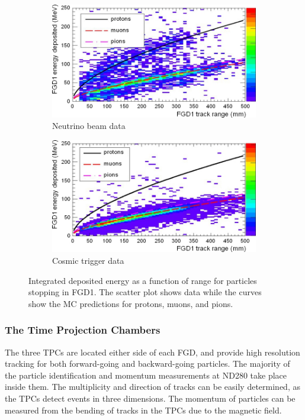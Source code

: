 \begin{figure}
\centering
\hspace{0.7cm}
\begin{subfigure}{.7\textwidth}
\centering
  \includegraphics[width=0.95\linewidth]{figs/FGD1beam}
  \caption{Neutrino beam data}
  \label{fig:fgd1beam}
\end{subfigure}
\newline
\begin{subfigure}{.7\textwidth}
  \includegraphics[width=0.95\linewidth]{figs/FGD1cosmic}
  \caption{Cosmic trigger data}
  \label{fig:FGD1cosmic}
\end{subfigure}
\caption{Integrated deposited energy as a function of range for particles stopping in FGD1. The scatter plot shows data while the curves show the MC predictions for protons, muons, and pions.}
\label{fig:FGD1}
\end{figure}

\subsubsection{The Time Projection Chambers}\label{sec:tpc}

The three TPCs are located either side of each FGD, and provide high resolution tracking for both forward-going and backward-going particles. The majority of the particle identification and momentum measurements at ND280 take place inside them. The multiplicity and direction of tracks can be easily determined, as the TPCs detect events in three dimensions. The momentum of particles can be measured from the bending of tracks in the TPCs due to the magnetic field.

